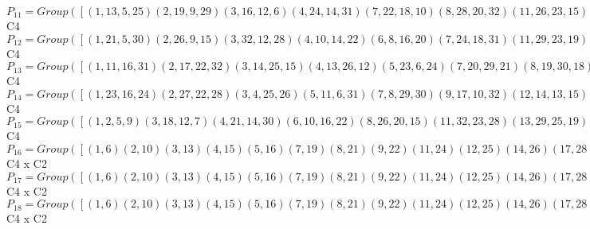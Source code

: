 \documentclass[varwidth=\maxdimen,border=10]{standalone}
\begin{document}
\begin{tabular}
$P_{11} = Group( [ ( 1,13, 5,25)( 2,19, 9,29)( 3,16,12, 6)( 4,24,14,31)( 7,22,18,10)( 8,28,20,32)(11,26,23,15)(17,30,27,21), ( 1, 5)( 2, 9)( 3,12)( 4,14)( 6,16)( 7,18)( 8,20)(10,22)(11,23)(13,25)(15,26)(17,27)(19,29)(21,30)(24,31)(28,32) ] )\cong$ C4\ \\
$P_{12} = Group( [ ( 1,21, 5,30)( 2,26, 9,15)( 3,32,12,28)( 4,10,14,22)( 6, 8,16,20)( 7,24,18,31)(11,29,23,19)(13,27,25,17), ( 1, 5)( 2, 9)( 3,12)( 4,14)( 6,16)( 7,18)( 8,20)(10,22)(11,23)(13,25)(15,26)(17,27)(19,29)(21,30)(24,31)(28,32) ] )\cong$ C4\ \\
$P_{13} = Group( [ ( 1,11,16,31)( 2,17,22,32)( 3,14,25,15)( 4,13,26,12)( 5,23, 6,24)( 7,20,29,21)( 8,19,30,18)( 9,27,10,28), ( 1,16)( 2,22)( 3,25)( 4,26)( 5, 6)( 7,29)( 8,30)( 9,10)(11,31)(12,13)(14,15)(17,32)(18,19)(20,21)(23,24)(27,28) ] )\cong$ C4\ \\
$P_{14} = Group( [ ( 1,23,16,24)( 2,27,22,28)( 3, 4,25,26)( 5,11, 6,31)( 7, 8,29,30)( 9,17,10,32)(12,14,13,15)(18,20,19,21), ( 1,16)( 2,22)( 3,25)( 4,26)( 5, 6)( 7,29)( 8,30)( 9,10)(11,31)(12,13)(14,15)(17,32)(18,19)(20,21)(23,24)(27,28) ] )\cong$ C4\ \\
$P_{15} = Group( [ ( 1, 2, 5, 9)( 3,18,12, 7)( 4,21,14,30)( 6,10,16,22)( 8,26,20,15)(11,32,23,28)(13,29,25,19)(17,24,27,31), ( 1, 5)( 2, 9)( 3,12)( 4,14)( 6,16)( 7,18)( 8,20)(10,22)(11,23)(13,25)(15,26)(17,27)(19,29)(21,30)(24,31)(28,32) ] )\cong$ C4\ \\
$P_{16} = Group( [ ( 1, 6)( 2,10)( 3,13)( 4,15)( 5,16)( 7,19)( 8,21)( 9,22)(11,24)(12,25)(14,26)(17,28)(18,29)(20,30)(23,31)(27,32), ( 1, 5)( 2, 9)( 3,12)( 4,14)( 6,16)( 7,18)( 8,20)(10,22)(11,23)(13,25)(15,26)(17,27)(19,29)(21,30)(24,31)(28,32), ( 1, 2, 5, 9)( 3,18,12, 7)( 4,21,14,30)( 6,10,16,22)( 8,26,20,15)(11,32,23,28)(13,29,25,19)(17,24,27,31) ] )\cong$ C4 x C2\ \\
$P_{17} = Group( [ ( 1, 6)( 2,10)( 3,13)( 4,15)( 5,16)( 7,19)( 8,21)( 9,22)(11,24)(12,25)(14,26)(17,28)(18,29)(20,30)(23,31)(27,32), ( 1, 5)( 2, 9)( 3,12)( 4,14)( 6,16)( 7,18)( 8,20)(10,22)(11,23)(13,25)(15,26)(17,27)(19,29)(21,30)(24,31)(28,32), ( 1,21, 5,30)( 2,26, 9,15)( 3,32,12,28)( 4,10,14,22)( 6, 8,16,20)( 7,24,18,31)(11,29,23,19)(13,27,25,17) ] )\cong$ C4 x C2\ \\
$P_{18} = Group( [ ( 1, 6)( 2,10)( 3,13)( 4,15)( 5,16)( 7,19)( 8,21)( 9,22)(11,24)(12,25)(14,26)(17,28)(18,29)(20,30)(23,31)(27,32), ( 1, 5)( 2, 9)( 3,12)( 4,14)( 6,16)( 7,18)( 8,20)(10,22)(11,23)(13,25)(15,26)(17,27)(19,29)(21,30)(24,31)(28,32), ( 1,11,16,31)( 2,17,22,32)( 3,14,25,15)( 4,13,26,12)( 5,23, 6,24)( 7,20,29,21)( 8,19,30,18)( 9,27,10,28) ] )\cong$ C4 x C2\ \\

\end{tabular}
\end{document}
